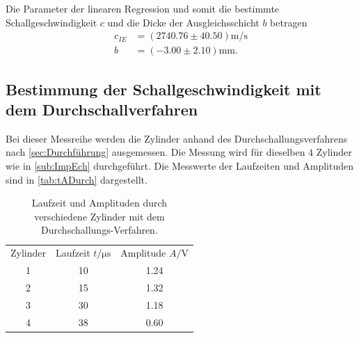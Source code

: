 Die Parameter der linearen Regression und somit die bestimmte Schallgeschwindigkeit $c$ und die Dicke der Ausgleichsschicht $b$ betragen
\begin{align*}
  c_{IE}& =( 2740.76\pm 40.50 ) \si{\meter\per\second}\\
  b &= (-3.00\pm 2.10) \si{\milli\meter}.
\end{align*}


\subsection{Bestimmung der Schallgeschwindigkeit mit dem Durchschallverfahren}
\label{subsec:SchallDurchV}

Bei dieser Messreihe werden die Zylinder anhand des Durchschallungsverfahrens nach \autoref{sec:Durchführung} ausgemessen.
Die Messung wird für dieselben $4$ Zylinder wie in \autoref{sub:ImpEch} durchgeführt.
Die Messwerte der Laufzeiten und Amplituden sind in \autoref{tab:tADurch} dargestellt.

\begin{table}[H]
  \centering
  \caption{Laufzeit und Amplituden durch verschiedene Zylinder mit dem Durchschallungs-Verfahren.}
  \label{tab:tADurch}
  \begin{tabular}{S[table-format=1.0] S[table-format=2.0] S[table-format=1.2] }
  \toprule
  {Zylinder} & {Laufzeit $t / \si{\micro\second}$} &  {Amplitude $A / \si{\volt}$}\\
  1 &  10  & 1.24  \\
  2 &  15  & 1.32  \\
  3 &  30  & 1.18  \\
  4 &  38  & 0.60  \\
  \bottomrule
  \end{tabular}
\end{table}

